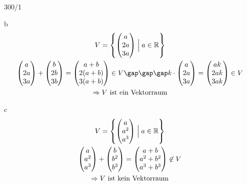 \begin{exercise}{300/1}
  \item [b]
  \begin{gather*}
    V = \left\{\begin{pmatrix}a \\ 2a \\ 3a\end{pmatrix} \Bigm| a \in \mathbb{R}\right\} \\
    \begin{pmatrix}a \\ 2a \\ 3a\end{pmatrix} + \begin{pmatrix}b \\ 2b \\ 3b\end{pmatrix} = \begin{pmatrix}a + b \\ 2(a + b) \\ 3(a + b)\end{pmatrix} \in V \gap\gap\gap k \cdot \begin{pmatrix}a \\ 2a \\ 3a\end{pmatrix} = \begin{pmatrix}ak \\ 2ak \\ 3ak\end{pmatrix} \in V \\
    \Rightarrow \text{$V$ ist ein Vektorraum}
  \end{gather*}
  \item [c]
  \begin{gather*}
    V = \left\{\begin{pmatrix}a \\ a^2 \\ a^3\end{pmatrix} \Bigm| a \in \mathbb{R}\right\} \\
    \begin{pmatrix}a \\ a^2 \\ a^3\end{pmatrix} + \begin{pmatrix}b \\ b^2 \\ b^3\end{pmatrix} = \begin{pmatrix}a + b \\ a^2 + b^2 \\ a^3 + b^3 \end{pmatrix} \not\in V \\
    \Rightarrow \text{$V$ ist kein Vektorraum}
  \end{gather*}
\end{exercise}
